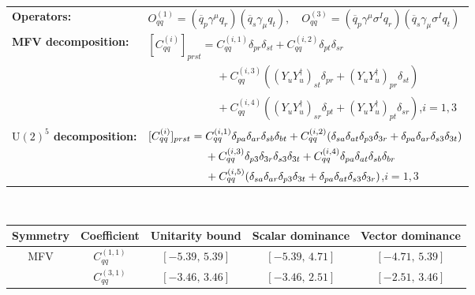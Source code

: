 \begin{table}[tbp]
\centering
{\small
\begin{tabular}{ll}
    \textbf{Operators:} &
        $\boxed{O_{qq}^{(1)} = (\overline q_p \gamma^\mu q_r)(\overline q_s \gamma_\mu q_t),\quad O_{qq}^{(3)} = (\overline q_p \gamma^\mu \sigma^I q_r)(\overline q_s \gamma_\mu \sigma^I q_t)}$ \\[0.2cm]
    \textbf{MFV decomposition:} &
        $[C_{qq}^{(i)}]_{prst} =
            C_{qq}^{(i,1)}\delta_{pr}\delta_{st}
            + C_{qq}^{(i,2)}\delta_{pt}\delta_{sr}
            $ \\
        & $\phantom{[C_{qq}^{(i)}]_{prst} ={}}+ C_{qq}^{(i,3)}((Y_u Y_u^\dagger)_{st}\delta_{pr} + (Y_u Y_u^\dagger)_{pr}\delta_{st})$ \\
        & $\phantom{[C_{qq}^{(i)}]_{prst} ={}}
            + C_{qq}^{(i,4)}((Y_u Y_u^\dagger)_{sr}\delta_{pt} + (Y_u Y_u^\dagger)_{pt}\delta_{sr})$,\quad $i=1,3$ \\[0.15cm]
    \textbf{$\mathrm{U}(2)^5$ decomposition:} &
        $[C_{qq}^{(i)}]_{prst} =
            C_{qq}^{(i,1)}\Pij{p}{r}{a}\Pij{s}{t}{b}
            + C_{qq}^{(i,2)}(\Pij{s}{t}{a}\delta_{p3}\delta_{3r} + \Pij{p}{r}{a}\delta_{s3}\delta_{3t})
            $ \\
        & $\phantom{[C_{qq}^{(i)}]_{prst} ={}}+ C_{qq}^{(i,3)}\delta_{p3}\delta_{3r}\delta_{s3}\delta_{3t}
            + C_{qq}^{(i,4)}\Pij{p}{t}{a}\Pij{s}{r}{b}
            $ \\
        & $\phantom{[C_{qq}^{(i)}]_{prst} ={}}+ C_{qq}^{(i,5)}(\Pij{s}{r}{a}\delta_{p3}\delta_{3t} + \Pij{p}{t}{a}\delta_{s3}\delta_{3r})$,\quad $i=1,3$ \\
\end{tabular}
\\[0.3cm]
\renewcommand{\arraystretch}{1.3}
\begin{tabular}{ccccc}
    \toprule
    \rowcolor{hdrcolor}
    \textbf{Symmetry} & \textbf{Coefficient}
        & \textbf{Unitarity bound}
        & \textbf{Scalar dominance}
        & \textbf{Vector dominance} \\
    \midrule
    \multirow{8}{*}{MFV}
        & $C_{qq}^{(1,1)}$ & $[-5.39,\, 5.39]$ & $[-5.39,\, 4.71]$ & $[-4.71,\, 5.39]$ \\
        & $C_{qq}^{(3,1)}$ & $[-3.46,\, 3.46]$ & $[-3.46,\, 2.51]$ & $[-2.51,\, 3.46]$ \\

\end{tabular}}
\end{table}
